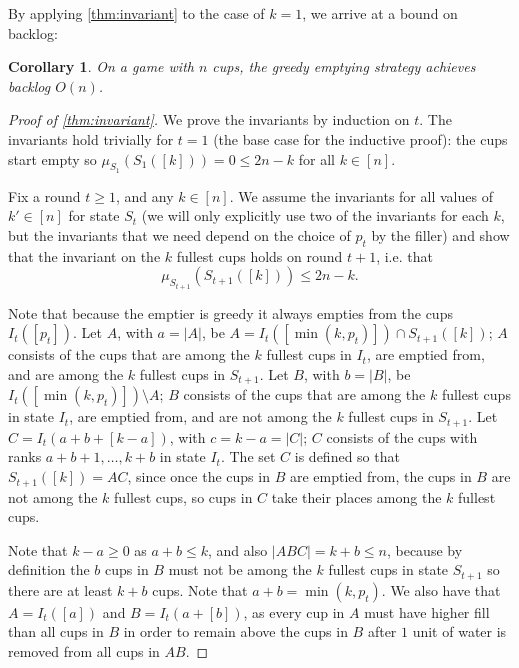 \documentclass[twocolumn]{article}[10pt]
\newtheorem{corollary}{Corollary}
\begin{document}
By applying \cref{thm:invariant} to the case of $k = 1$, we arrive at a bound on backlog:
\begin{corollary}
  On a game with $n$ cups, the greedy emptying strategy achieves backlog $O(n)$.
  \label{cor:upperbound}
\end{corollary}

\begin{proof}[Proof of \cref{thm:invariant}]
We prove the invariants by induction on $t$.
The invariants hold trivially for $t=1$ (the base case for the inductive proof): 
the cups start empty so $\mu_{S_1}(S_1([k])) = 0 \le 2n-k$ for all $k \in [n]$.

Fix a round $t \ge 1$, and any $k \in [n]$. We assume the invariants for all
values of $k' \in[n]$ for state $S_t$ (we will only explicitly use two of the
invariants for each $k$, but the invariants that we need depend on the
choice of $p_t$ by the filler) and show that
the invariant on the $k$ fullest cups holds on round $t+1$, i.e. that
$$\mu_{S_{t+1}}(S_{t+1}([k])) \le 2n-k.$$

Note that because the emptier is greedy it always empties from the cups
$I_t([p_t])$. Let $A$, with $a=|A|$, be $A = I_t([\min(k, p_t)]) \cap
S_{t+1}([k])$; $A$ consists of the cups that are among the $k$ fullest cups in
$I_t$, are emptied from, and are among the $k$ fullest cups in $S_{t+1}$. Let
$B$, with $b=|B|$, be $I_t([\min(k, p_t)]) \setminus A$; $B$ consists of the
cups that are among the $k$ fullest cups in state $I_t$, are emptied from, and
are not among the $k$ fullest cups in $S_{t+1}$. Let $C = I_t(a+b+[k-a])$, with
$c=k-a = |C|$; $C$ consists of the cups with ranks $a + b + 1, \ldots, k + b$
in state $I_t$. The set $C$ is defined so that $S_{t+1}([k]) = AC$, since once
the cups in $B$ are emptied from, the cups in $B$ are not among the $k$ fullest
cups, so cups in $C$ take their places among the $k$ fullest cups.

Note that $k-a \ge 0$ as $a+b \le k$, and also $|ABC| = k+b \le n$, because by
definition the $b$ cups in $B$ must not be among the $k$ fullest cups in state
$S_{t+1}$ so there are at least $k+b$ cups. 
Note that $a + b = \min(k, p_t)$. We also have that $A = I_t([a])$ and $B =
I_t(a+[b])$, as every cup in $A$ must have higher fill than all cups in $B$ in
order to remain above the cups in $B$ after $1$ unit of water is removed from
all cups in $AB$.


\end{proof}
\end{document}
